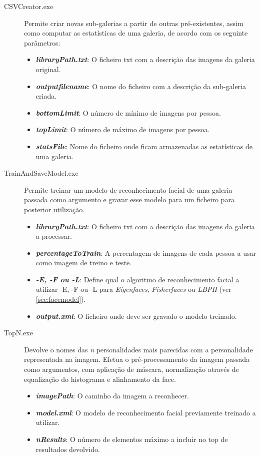 \begin{description}
\item[CSVCreator.exe] Permite criar novas sub-galerias a partir de outras pré-existentes, assim como computar as estatísticas de uma galeria, de acordo com os seguinte parâmetros:

\begin{itemize}
\item \textbf{\textit{libraryPath.txt}}: O ficheiro txt com a descrição das imagens da galeria original.
\item \textbf{\textit{outputfilename}}: O nome do ficheiro com a descrição da sub-galeria criada.
\item \textbf{\textit{bottomLimit}}: O número de mínimo de imagens por pessoa.
\item \textbf{\textit{topLimit}}: O número de máximo de imagens por pessoa.
\item \textbf{\textit{statsFile}}: Nome do ficheiro onde ficam armazenadas as estatísticas de uma galeria.
\end{itemize}

\item[TrainAndSaveModel.exe] Permite treinar um modelo de reconhecimento facial de uma galeria passada como argumento e gravar esse modelo para um ficheiro para posterior utilização.

\begin{itemize}
\item \textbf{\textit{libraryPath.txt}}: O ficheiro txt com a descrição das imagens da galeria a processar.
\item \textbf{\textit{percentageToTrain}}: A percentagem de imagens de cada pessoa a usar como imagem de treino e teste.
\item \textbf{\textit{-E, -F ou -L}}: Define qual o algoritmo de reconhecimento facial a utilizar -E, -F ou -L para \textit{Eigenfaces}, \textit{Fisherfaces} ou \textit{LBPH} (ver \ref{sec:facemodel}).
\item \textbf{\textit{output.xml}}: O ficheiro onde deve ser gravado o modelo treinado.
\end{itemize}

\item[TopN.exe] Devolve o nomes das \textit{n} personalidades mais parecidas com a personalidade representada na imagem. Efetua o pré-processamento da imagem passada como argumentos, com aplicação de máscara, normalização através de equalização do histograma e alinhamento da face.

\begin{itemize}
\item \textbf{\textit{imagePath}}: O caminho da imagem a reconhecer.
\item \textbf{\textit{model.xml}}: O modelo de reconhecimento facial previamente treinado a utilizar.
\item \textbf{\textit{nResults}}: O número de elementos máximo a incluir no top de resultados devolvido.
\end{itemize}

\end{description}